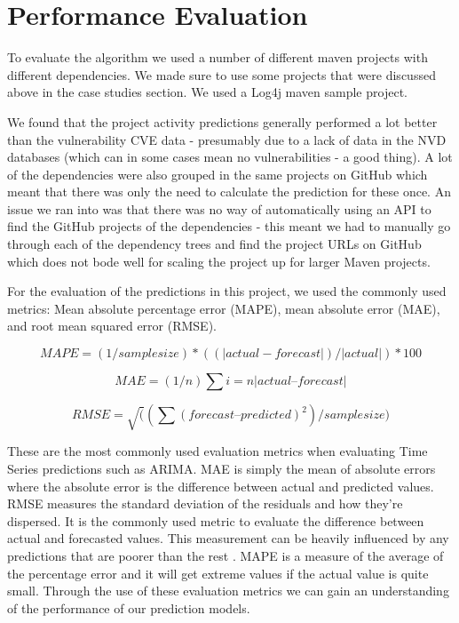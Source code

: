 \documentclass[conference]{IEEEtran}
\begin{document}
\section{Performance Evaluation}

To evaluate the algorithm we used a number of different maven projects with different dependencies. We made sure to use some projects that were discussed above in the case studies section. We used a Log4j maven sample project. 

We found that the project activity predictions generally performed a lot better than the vulnerability CVE data - presumably due to a lack of data in the NVD databases (which can in some cases mean no vulnerabilities - a good thing). A lot of the dependencies were also grouped in the same projects on GitHub which meant that there was only the need to calculate the prediction for these once. An issue we ran into was that there was no way of automatically using an API to find the GitHub projects of the dependencies - this meant we had to manually go through each of the dependency trees and find the project URLs on GitHub which does not bode well for scaling the project up for larger Maven projects. 

For the evaluation of the predictions in this project, we used the commonly used metrics: Mean absolute percentage error (MAPE), mean absolute error (MAE), and root mean squared error (RMSE). 

\[ MAPE = (1 / sample size) * ( ( |actual - forecast| ) / |actual| ) * 100 \]

\[ MAE = (1/n) \sum{i=n} |actual – forecast|  \]

\[ RMSE = \sqrt( (\sum (forecast – predicted) ^ 2) / sample size )  \]

These are the most commonly used evaluation metrics when evaluating Time Series predictions such as ARIMA. MAE is simply the mean of absolute errors where the absolute error is the difference between actual and predicted values. RMSE measures the standard deviation of the residuals and how they're dispersed. It is the commonly used metric to evaluate the difference between actual and forecasted values. This measurement can be heavily influenced by any predictions that are poorer than the rest \cite{f_abdulhafidh_dael_performance_2022}. MAPE is a measure of the average of the percentage error and it will get extreme values if the actual value is quite small. Through the use of these evaluation metrics we can gain an understanding of the performance of our prediction models. 
\end{document}
